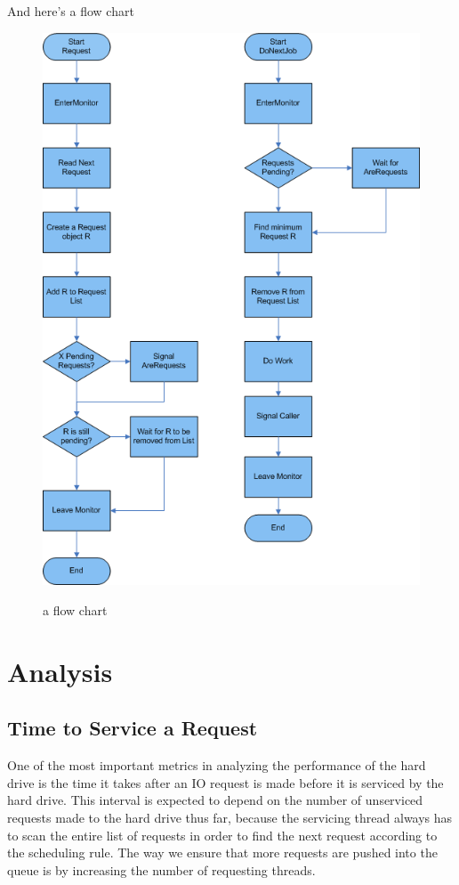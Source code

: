 \documentclass{report}
\begin{document}
And here's a flow chart
\begin{figure}[htb!]
    \centering
    \includegraphics[scale=1]{300_flow.png}
    \label{fig:flow}
    \caption{a flow chart}
\end{figure}

\newpage
\section{Analysis} %
\subsection{Time to Service a Request}
One of the most important metrics in analyzing the performance of the hard drive is the
time it takes after an IO request is made before it is serviced by the hard drive. This
interval is expected to depend on the number of unserviced requests made to the hard drive
thus far, because the servicing thread always has to scan the entire list of requests in
order to find the next request according to the scheduling rule. The way we ensure that
more requests are pushed into the queue is by increasing the number of requesting threads.
\end{document}
